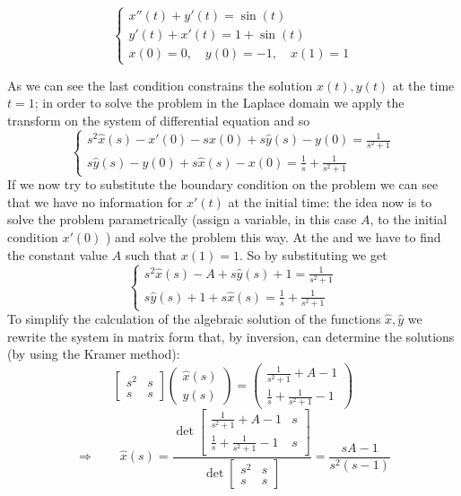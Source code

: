 	\[ \begin{cases}
		x''(t) + y'(t) = \sin(t) \\ y'(t) + x'(t) = 1 + \sin(t) \\
		x(0) = 0 , \quad y(0) = -1,\quad x(1) = 1
	\end{cases} \]
	
	As we can see the last condition constrains the solution $x(t),y(t)$ at the time $t=1$; in order to solve the problem in the Laplace domain we apply the transform on the system of differential equation and so
	\[ \begin{cases}
		s^2 \hat x(s) - x'(0) - s x(0)  + s\hat y(s) - y(0) = \frac 1 {s^2+1} \\
		s \hat y(s) - y(0) + s\hat x(s) - x(0) = \frac 1 s + \frac{1}{s^2+1}
	\end{cases} \]
	If we now try to substitute the boundary condition on the problem we can see that we have no information for $x'(t)$ at the initial time: the idea now is to solve the problem parametrically (assign a variable, in this case $A$, to the initial condition $x'(0)$ ) and solve the problem this way. At the and we have to find the constant value $A$ such that $x(1) = 1$. So by substituting we get
	\[ \begin{cases}
		s^2 \hat x(s) - A + s\hat y(s) +1 = \frac 1 {s^2+1} \\
		s \hat y(s) +1 + s\hat x(s) = \frac 1 s + \frac{1}{s^2+1}
	\end{cases} \]
	To simplify the calculation of the algebraic solution of the functions $\hat x,\hat y$ we rewrite the system in matrix form that, by inversion, can determine the solutions (by using the Kramer method):
	\[ \begin{bmatrix}
		s^2 & s  \\ s & s
	\end{bmatrix} \begin{pmatrix}
		\hat x(s) \\ \hat y(s)
	\end{pmatrix} = \begin{pmatrix}
		\frac{1}{s^2+1} + A - 1 \\ \frac 1 s + \frac{1}{s^2+1} - 1	
	\end{pmatrix} \]
	\[ \Rightarrow \qquad \hat x(s) = \dfrac{\det\begin{bmatrix}
		\frac{1}{s^2+1} + A - 1 & s  \\ \frac 1 s + \frac{1}{s^2+1} - 1 & s
	\end{bmatrix} }{\det \begin{bmatrix}
		s^2 & s  \\ s & s
	\end{bmatrix}} = \frac{sA - 1}{s^2(s-1)} \]
